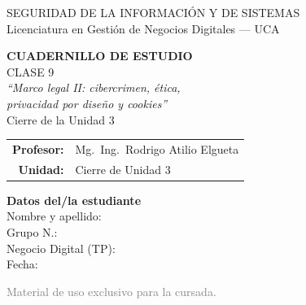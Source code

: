 \documentclass[12pt,a4paper]{article}
\begin{document}
\begin{titlepage}
\centering
\vspace*{1cm}

\begin{cajaTitulo}[width=\textwidth, halign=center]
  SEGURIDAD DE LA INFORMACI\'ON Y DE SISTEMAS\\[4pt]
  {\large Licenciatura en Gesti\'on de Negocios Digitales --- UCA}
\end{cajaTitulo}

\vspace{1.5cm}

{\Huge\bfseries\color{azulUCA} CUADERNILLO DE ESTUDIO}\\[8pt]
{\LARGE\color{doradoUCA} CLASE 9}\\[12pt]
{\Large\itshape ``Marco legal II: cibercrimen, \'etica,\\[2pt] privacidad por dise\~no y cookies''}\\[6pt]
{\large\color{azulCookie}\; Cierre de la Unidad 3}\\[1.5cm]

\begin{tabular}{rl}
\textbf{Profesor:}   & Mg.\ Ing.\ Rodrigo Atilio Elgueta \\[4pt]
\textbf{Unidad:}     & Cierre de Unidad 3 \\[4pt]
\end{tabular}

\vfill

\begin{tcolorbox}[colback=grisClaro, colframe=azulUCA, arc=3mm, width=0.9\textwidth]
  \centering
  {\bfseries Datos del/la estudiante}\\[10pt]
  Nombre y apellido: \underline{\hspace{5cm}}\\[10pt]
  Grupo N.\textdegree: \underline{\hspace{5cm}}\\[10pt]
  Negocio Digital (TP): \underline{\hspace{5cm}}\\[10pt]
  Fecha: \underline{\hspace{5cm}}
\end{tcolorbox}

\vspace{1cm}
{\small\textcolor{gray}{Material de uso exclusivo para la cursada.}}
\end{titlepage}
\end{document}
